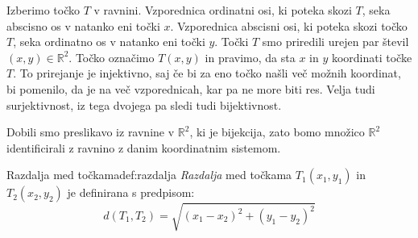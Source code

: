 \documentclass[a4,12pt]{article}
\newcommand{\R}{\mathbb{R}}
\begin{document}
    {
        Izberimo točko \(T\) v ravnini. Vzporednica ordinatni osi, ki poteka skozi \(T\), seka abscisno os v natanko eni
        točki \(x\). Vzporednica abscisni osi, ki poteka skozi točko \(T\), seka ordinatno os v natanko eni točki \(y\).
        Točki \(T\) smo priredili urejen par števil \(\left(x, y\right) \in \R^2\). Točko označimo \(T\left(x, y\right)\)
        in pravimo, da sta \(x\) in \(y\) koordinati točke \(T\). To prirejanje je injektivno, saj če bi za eno točko našli
        več možnih koordinat, bi pomenilo, da je na več vzporednicah, kar pa ne more biti res. Velja tudi surjektivnost,
        iz tega dvojega pa sledi tudi bijektivnost.
        \begin{figure}[H]
            \centering
        \end{figure}
    }

    Dobili smo preslikavo iz ravnine v \(\R^2\), ki je bijekcija, zato bomo množico \(\R^2\) identificirali
    z ravnino z danim koordinatnim sistemom.
    
    \begin{definition}{Razdalja med točkama}{def:razdalja}
        \emph{Razdalja} med točkama \(T_1\left(x_1, y_1\right)\) in \(T_2\left(x_2, y_2\right)\) je definirana s predpisom:
        \[d\left(T_1, T_2\right) = \sqrt{\left(x_1 - x_2\right) ^ 2 + \left(y_1 - y_2\right)^2}\]
        \begin{figure}[H]
            \centering
        \end{figure}
    \end{definition}
\end{document}
